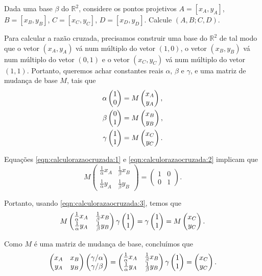 \begin{exer}
Dada uma base \(\beta\) do \(\mathbb{R}^2\), considere os pontos projetivos $A = [x_A,y_A]$, $B = [x_B,y_B]$, $C = [x_C,y_C]$, $D = [x_D,y_D]$.
Calcule $(A,B;C,D)$.
\end{exer}

\begin{sol}
  Para calcular a razão cruzada, precisamos construir uma base do $\mathbb{R}^2$ de tal modo que o vetor $(x_A,y_A)$ vá num múltiplo do vetor $(1,0)$, o vetor $(x_B,y_B)$ vá num múltiplo do vetor $(0,1)$ e o vetor $(x_C,y_C)$ vá num múltiplo do vetor $(1,1)$.
  Portanto, queremos achar constantes reais \(\alpha\), \(\beta\) e \(\gamma\), e uma matriz de mudança de base \(M\), tais que 
    \begin{align}
      \alpha \begin{pmatrix} 1 \\ 0 \\  \end{pmatrix} &= M \begin{pmatrix} x_A \\ y_A \\  \end{pmatrix} \label{eqn:calculorazaocruzada:1}, \\
      \beta  \begin{pmatrix} 0 \\ 1 \\  \end{pmatrix} &= M \begin{pmatrix} x_B \\ y_B \\  \end{pmatrix} \label{eqn:calculorazaocruzada:2}, \\
      \gamma \begin{pmatrix} 1 \\ 1 \\  \end{pmatrix} &= M \begin{pmatrix} x_C \\ y_C \\  \end{pmatrix} \label{eqn:calculorazaocruzada:3}. 
    \end{align} 

  Equações \ref{eqn:calculorazaocruzada:1} e \ref{eqn:calculorazaocruzada:2} implicam que
  \begin{equation} \label{eqn:calculorazaocruzada:4}
    M \begin{pmatrix} \frac{1}{\alpha} x_A& \frac{1}{\beta} x_B\\ \frac{1}{\alpha} y_A& \frac{1}{\beta} y_B \end{pmatrix} 
    = \begin{pmatrix} 1 & 0 \\ 0 & 1 \end{pmatrix}.
  \end{equation}

  Portanto, usando \ref{eqn:calculorazaocruzada:3}, temos que
  \begin{equation}
    M \begin{pmatrix} \frac{1}{\alpha} x_A& \frac{1}{\beta} x_B\\ \frac{1}{\alpha} y_A& \frac{1}{\beta} y_B \end{pmatrix} \gamma \begin{pmatrix} 1 \\ 1 \\  \end{pmatrix}
    = \gamma \begin{pmatrix} 1 \\ 1 \\  \end{pmatrix}
    = M \begin{pmatrix} x_C \\ y_C \\  \end{pmatrix}.
  \end{equation}

  Como \(M\) é uma matriz de mudança de base, concluímos que
  \begin{equation}
    \begin{pmatrix}
        x_A& x_B \\
        y_A& y_B
    \end{pmatrix}
    \begin{pmatrix} \gamma/\alpha \\ \gamma/\beta \\  \end{pmatrix}
    = \begin{pmatrix} \frac{1}{\alpha} x_A& \frac{1}{\beta} x_B\\ \frac{1}{\alpha} y_A& \frac{1}{\beta} y_B \end{pmatrix} \gamma \begin{pmatrix} 1 \\ 1 \\  \end{pmatrix}
    = \begin{pmatrix} x_C \\ y_C \\  \end{pmatrix}.
  \end{equation}


\end{sol}
